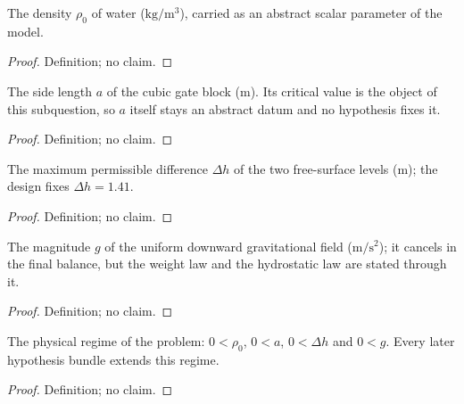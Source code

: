 \begin{definition}
\label{def:IPhO2026Problems_problem_IPhO_2026_1_A_1:rho0}
The density $\rho_0$ of water ($\mathrm{kg/m^3}$), carried as an abstract
scalar parameter of the model.
\end{definition}
\begin{proof}
Definition; no claim.
\end{proof}

\begin{definition}
\label{def:IPhO2026Problems_problem_IPhO_2026_1_A_1:a}
The side length $a$ of the cubic gate block (m). Its critical value is the
object of this subquestion, so $a$ itself stays an abstract datum and no
hypothesis fixes it.
\end{definition}
\begin{proof}
Definition; no claim.
\end{proof}

\begin{definition}
\label{def:IPhO2026Problems_problem_IPhO_2026_1_A_1:DeltaH}
The maximum permissible difference $\Delta h$ of the two free-surface levels
(m); the design fixes $\Delta h = 1.41$.
\end{definition}
\begin{proof}
Definition; no claim.
\end{proof}

\begin{definition}
\label{def:IPhO2026Problems_problem_IPhO_2026_1_A_1:g}
The magnitude $g$ of the uniform downward gravitational field
($\mathrm{m/s^2}$); it cancels in the final balance, but the weight law and
the hydrostatic law are stated through it.
\end{definition}
\begin{proof}
Definition; no claim.
\end{proof}

\begin{definition}
\label{def:IPhO2026Problems_problem_IPhO_2026_1_A_1:PhysicalParameters}
The physical regime of the problem: $0 < \rho_0$, $0 < a$, $0 < \Delta h$ and
$0 < g$. Every later hypothesis bundle extends this regime.
\end{definition}
\begin{proof}
Definition; no claim.
\end{proof}

